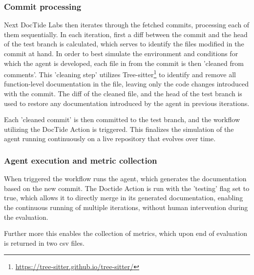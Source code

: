 \subsubsection{Commit processing}
Next DocTide Labs then iterates through the fetched commits, processing each of them sequentially. In each iteration, first a diff between the commit and the head of the test branch is calculated, which serves to identify the files modified in the commit at hand. In order to best simulate the environment and conditions for which the agent is developed, each file in from the commit is then 'cleaned from comments'. This 'cleaning step' utilizes Tree-sitter\footnote{\url{https://tree-sitter.github.io/tree-sitter/}} to identify and remove all function-level documentation in the file, leaving only the code changes introduced with the commit. The diff of the cleaned file, and the head of the test branch is used to restore any documentation introduced by the agent in previous iterations.

Each 'cleaned commit' is then committed to the test branch, and the workflow utilizing the DocTide Action is triggered. This finalizes the simulation of the agent running continuously on a live repository that evolves over time.

\subsubsection{Agent execution and metric collection}
When triggered the workflow runs the agent, which generates the documentation based on the new commit. The Doctide Action is run with the 'testing' flag set to true, which allows it to directly merge in its generated documentation, enabling the continuous running of multiple iterations, without human intervention during the evaluation. 

Further more this enables the collection of metrics, which upon end of evaluation is returned in two csv files.

